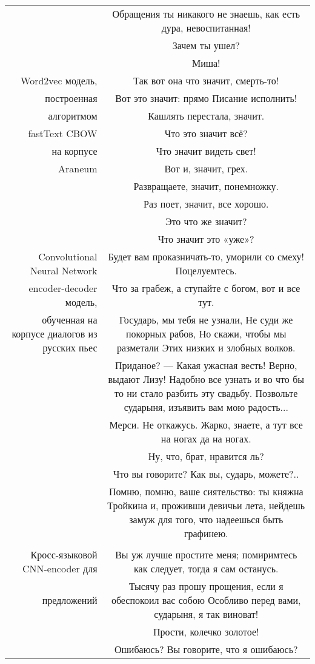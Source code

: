 \documentclass[a4paper,14pt]{article}
\begin{document}
\begin{center}
\begin{tabularx}{\linewidth}{ | N | C | }
&Обращения ты никакого не знаешь, как есть дура, невоспитанная!\\
&Зачем ты ушел?\\
&Миша!\\
\hline
Word2vec модель, &Так вот она что значит, смерть-то!\\
построенная &Вот это значит: прямо Писание исполнить!\\
алгоритмом &Кашлять перестала, значит.\\
fastText CBOW&Что это значит всё?\\
на корпусе&Что значит видеть свет!\\
Araneum&Вот и, значит, грех.\\
&Развращаете, значит, понемножку.\\
&Раз поет, значит, все хорошо.\\
&Это что же значит?\\
&Что значит это «уже»?\\
\hline
Convolutional Neural Network&Будет вам проказничать-то, уморили со смеху! Поцелуемтесь.\\
encoder-decoder модель, &Что за грабеж, а ступайте с богом, вот и все тут.\\
обученная на корпусе диалогов из русских пьес&Государь, мы тебя не узнали, Не суди же покорных рабов, Но скажи, чтобы мы разметали Этих низких и злобных волков.\\
&Приданое? — Какая ужасная весть! Верно, выдают Лизу! Надобно все узнать и во что бы то ни стало разбить эту свадьбу.  Позвольте сударыня, изъявить вам мою радость...\\
&Мерси. Не откажусь. Жарко, знаете, а тут все на ногах да на ногах.\\
&Ну, что, брат, нравится ль?\\
&Что вы говорите? Как вы, сударь, можете?..\\
&Помню, помню, ваше сиятельство: ты княжна Тройкина и, проживши девичьи лета, нейдешь замуж для того, что надеешься быть графинею.\\ & \\ \hline
Кросс-языковой CNN-encoder для&Вы уж лучше простите меня; помиримтесь как следует, тогда я сам останусь.\\
предложений&Тысячу раз прошу прощения, если я обеспокоил вас собою  Особливо перед вами, сударыня, я так виноват!\\
&Прости, колечко золотое!\\
&Ошибаюсь? Вы говорите, что я ошибаюсь?\\

\end{tabularx}
\end{center}
\end{document}
